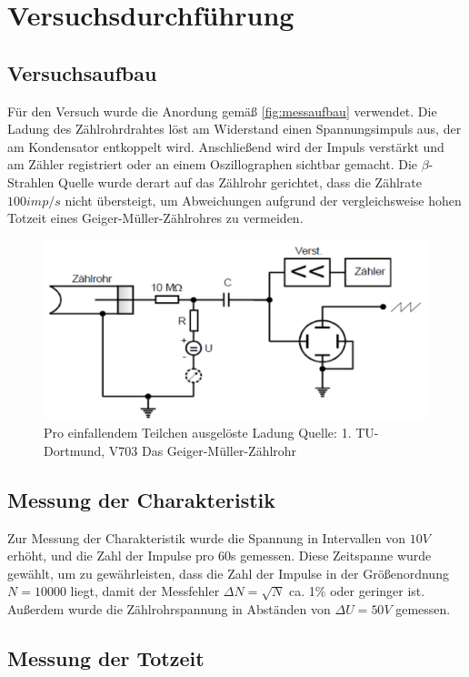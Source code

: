 \section{Versuchsdurchführung}
\subsection{Versuchsaufbau}
Für den Versuch wurde die Anordung gemäß \autoref{fig:messaufbau} verwendet. Die Ladung des Zählrohrdrahtes löst am 
Widerstand einen Spannungsimpuls aus, der am Kondensator entkoppelt wird. Anschließend wird der Impuls 
verstärkt und am Zähler registriert oder an einem Oszillographen sichtbar gemacht. Die $\beta$-Strahlen 
Quelle wurde derart auf das Zählrohr gerichtet, dass die Zählrate $100imp/s$ nicht übersteigt, um 
Abweichungen aufgrund der vergleichsweise hohen Totzeit eines Geiger-Müller-Zählrohres zu vermeiden.
\begin{figure}
    \centering
    \includegraphics{Messaufbau.pdf}
    \caption{Pro einfallendem Teilchen ausgelöste Ladung Quelle: 1. TU-Dortmund, V703 Das Geiger-Müller-Zählrohr}
    \label{fig:messaufbau}
  \end{figure}
\subsection{Messung der Charakteristik}
Zur Messung der Charakteristik wurde die Spannung in Intervallen von $10V$ erhöht, und die Zahl der Impulse 
pro 60s gemessen. Diese Zeitspanne wurde gewählt, um zu gewährleisten, dass die Zahl der Impulse in der 
Größenordnung $N=10000$  liegt, damit der Messfehler $\Delta N=\sqrt{N}$ ca. 1\% oder geringer ist. 
Außerdem wurde die Zählrohrspannung in Abständen von $\Delta U=50V$ gemessen.
\subsection{Messung der Totzeit}
